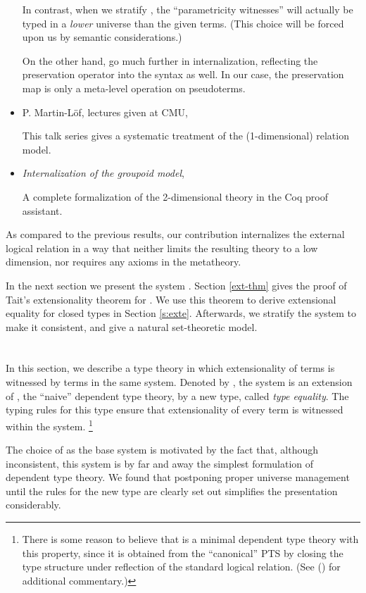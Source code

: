 \documentclass[10pt]{article}
\begin{document}
\begin{itemize}
In contrast, when we stratify , the ``parametricity witnesses''
will actually be typed in a \emph{lower} universe than the given
terms. (This choice will be forced upon us by semantic considerations.)

On the other hand, \cite{intpar} go much further in internalization,
reflecting the preservation operator into the syntax as well.
In our case, the preservation
map is only a meta-level operation on pseudoterms.

\item 
P. Martin-L\"of, lectures given at CMU, \cite{perML}

This talk series gives a systematic treatment of the (1-dimensional) relation model.
\item
\emph{Internalization of the groupoid model}, \cite{matthiu}

A complete formalization of the 2-dimensional theory in the Coq proof assistant.
\end{itemize}

As compared to the previous results,
our contribution internalizes the
external logical relation
in a way that neither limits the resulting theory to a low
dimension, nor requires any axioms in the metatheory.


In the next section we present the system .
Section \ref{ext-thm} gives the proof of
Tait's extensionality theorem for .
We use this theorem to derive extensional equality for closed types
in Section \ref{s:exte}.
Afterwards, we stratify the system to make it consistent,
and give a natural set-theoretic model.

\section{}
In this section, we describe a type theory in which
extensionality of terms is witnessed by terms in the same system.
Denoted by , the system is an extension of , the ``naive''
dependent type theory, by a new type, called
\emph{type equality}.
The typing rules for this type ensure that extensionality of every term is witnessed
within the system.
\footnote{
There is some reason to believe that 
is a minimal dependent type theory with this property,
since it is obtained from the ``canonical'' PTS 
by closing the type structure under reflection of the standard
logical relation.  (See (\cite{ett1}) for additional commentary.)
}

The choice of  as the base system is
motivated by the fact that, although inconsistent, this system is by
far and away the simplest formulation of dependent type theory.
We found that postponing proper universe management
until the rules for the new type are clearly set out
simplifies the presentation considerably.
\end{document}
